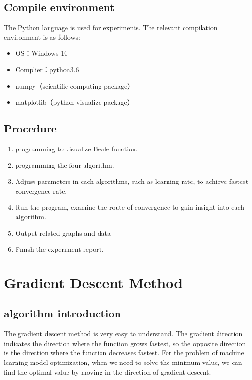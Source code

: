\documentclass[aps,letterpaper,10pt]{article}
\begin{document}
\subsection{Compile environment}
The Python language is used for experiments. The relevant compilation environment is as follows:
	\begin{itemize}
		\item OS：Windows 10
		\item Complier：python3.6
		\item numpy（scientific computing package）
		\item matplotlib（python visualize package）
	\end{itemize}

\subsection{Procedure}

	\begin{enumerate}
		\item programming to visualize Beale function.
		\item programming the four algorithm.
		\item Adjust parameters in each algorithms, such as learning rate, to achieve fastest convergence rate.
		\item Run the program, examine the route of convergence to gain insight into each algorithm.
		\item Output related graphs and data
		\item Finish the experiment report.
	\end{enumerate}


\newpage
\section{Gradient Descent Method}
\subsection{algorithm introduction}
The gradient descent method is very easy to understand. The gradient direction indicates the direction where the function grows fastest, so the opposite direction is the direction where the function decreases fastest. For the problem of machine learning model optimization, when we need to solve the minimum value, we can find the optimal value by moving in the direction of gradient descent.\vspace{3mm}
\end{document}
